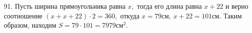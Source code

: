 91. Пусть ширина прямоугольника равна $x,$ тогда его длина равна $x+22$ и верно соотношение $(x+x+22)\cdot2=360,$ откуда $x=79\text{см},\ x+22=101\text{см}.$ Таким образом, находим
$S=79\cdot101=7979\text{см}^2.$\\
